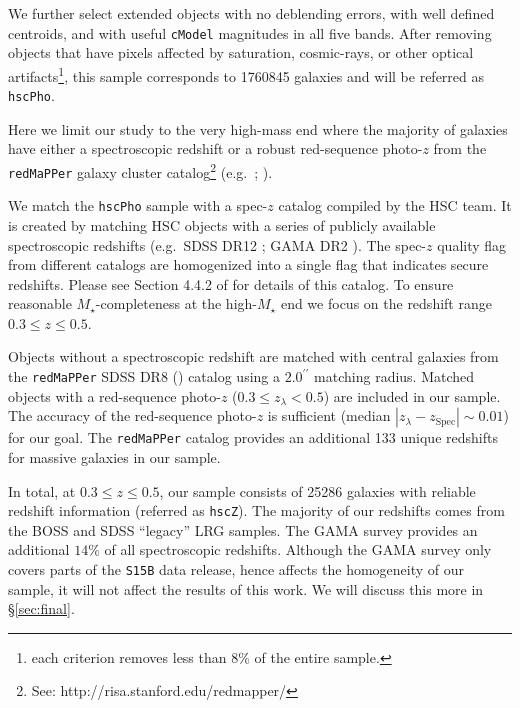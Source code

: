 \documentclass[a4paper,fleqn,usenatbib]{mnras}
\def\arcsec{{\prime\prime}}
\def\redm{\texttt{redMaPPer}}
\def\mstar{{$M_{\star}$}}
\begin{document}
    We further select extended objects with no deblending errors, with well defined 
    centroids, and with useful \texttt{cModel} magnitudes in all five bands. 
    After removing objects that have pixels affected by saturation, cosmic-rays, or 
    other optical artifacts\footnote{each criterion removes less than 8\% of the 
    entire sample.}, this sample corresponds to 1760845 galaxies and will be referred 
    as \texttt{hscPho}. 
        
    Here we limit our study to the very high-mass end where the majority of galaxies 
    have either a spectroscopic redshift or a robust red-sequence photo-$z$ from the 
    \redm{} galaxy cluster catalog\footnote{See: http://risa.stanford.edu/redmapper/} 
    (e.g.\ \citealt{Rykoff2014}; \citealt{Rozo2015b}).  

    We match the \texttt{hscPho} sample with a spec-$z$ catalog compiled by the HSC 
    team.
    It is created by matching HSC objects with a series of publicly available 
    spectroscopic redshifts (e.g.\ SDSS DR12 \citealt{SDSSDR12}; 
    GAMA DR2 \citealt{Liske2015}). 
    The spec-$z$ quality flag from different catalogs are homogenized into a single 
    flag that indicates secure redshifts.
    Please see Section 4.4.2 of \citet{HSC_DR1} for details of this catalog.  
    To ensure reasonable \mstar{}-completeness at the high-\mstar{} end we focus on
    the redshift range $0.3 \leq z \leq 0.5$. 
   
    Objects without a spectroscopic redshift are matched with central 
    galaxies from the \redm{} SDSS DR8 (\citealt{Rykoff2014}) catalog using a 
    $2.0^{\arcsec}$ matching radius. 
    Matched objects with a red-sequence photo-$z$ ($0.3 \leq z_{\lambda} < 0.5$) are 
    included in our sample. 
    The accuracy of the red-sequence photo-$z$ is sufficient (median 
    $|z_{\lambda} - z_{\mathrm{Spec}}| {\sim} 0.01$) for our goal.
    The \redm{} catalog provides an additional 133 unique redshifts for massive 
    galaxies in our sample.
        
    In total, at $0.3 \leq z \leq 0.5$, our sample consists of 25286 galaxies with 
    reliable redshift information (referred as \texttt{hscZ}).
    The majority of our redshifts comes from the BOSS and SDSS ``legacy'' LRG samples. 
    The GAMA survey provides an additional $14$\% of all spectroscopic redshifts.
    Although the GAMA survey only covers parts of the \texttt{S15B} data release, 
    hence affects the homogeneity of our sample, it will not affect the results of 
    this work.
    We will discuss this more in \S \ref{sec:final}.
\end{document}
